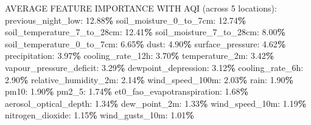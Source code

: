 \documentclass[
  letterpaper,
  DIV=11,
  numbers=noendperiod]{scrartcl}
\newenvironment{Shaded}{\begin{snugshade}}{\end{snugshade}}
\newcommand{\DecValTok}[1]{\textcolor[rgb]{0.00,0.00,0.81}{#1}}
\newcommand{\FloatTok}[1]{\textcolor[rgb]{0.00,0.00,0.81}{#1}}
\newcommand{\NormalTok}[1]{#1}
\newcommand{\OperatorTok}[1]{\textcolor[rgb]{0.81,0.36,0.00}{\textbf{#1}}}
\begin{document}
\begin{Shaded}
\begin{Highlighting}[]
\NormalTok{AVERAGE FEATURE IMPORTANCE WITH AQI (across }\DecValTok{5}\NormalTok{ locations):}
\NormalTok{  previous\_night\_low: }\FloatTok{12.88}\OperatorTok{\%}
\NormalTok{  soil\_moisture\_0\_to\_7cm: }\FloatTok{12.74}\OperatorTok{\%}
\NormalTok{  soil\_temperature\_7\_to\_28cm: }\FloatTok{12.41}\OperatorTok{\%}
\NormalTok{  soil\_moisture\_7\_to\_28cm: }\FloatTok{8.00}\OperatorTok{\%}
\NormalTok{  soil\_temperature\_0\_to\_7cm: }\FloatTok{6.65}\OperatorTok{\%}
\NormalTok{  dust: }\FloatTok{4.90}\OperatorTok{\%}
\NormalTok{  surface\_pressure: }\FloatTok{4.62}\OperatorTok{\%}
\NormalTok{  precipitation: }\FloatTok{3.97}\OperatorTok{\%}
\NormalTok{  cooling\_rate\_12h: }\FloatTok{3.70}\OperatorTok{\%}
\NormalTok{  temperature\_2m: }\FloatTok{3.42}\OperatorTok{\%}
\NormalTok{  vapour\_pressure\_deficit: }\FloatTok{3.29}\OperatorTok{\%}
\NormalTok{  dewpoint\_depression: }\FloatTok{3.12}\OperatorTok{\%}
\NormalTok{  cooling\_rate\_6h: }\FloatTok{2.90}\OperatorTok{\%}
\NormalTok{  relative\_humidity\_2m: }\FloatTok{2.14}\OperatorTok{\%}
\NormalTok{  wind\_speed\_100m: }\FloatTok{2.03}\OperatorTok{\%}
\NormalTok{  rain: }\FloatTok{1.90}\OperatorTok{\%}
\NormalTok{  pm10: }\FloatTok{1.90}\OperatorTok{\%}
\NormalTok{  pm2\_5: }\FloatTok{1.74}\OperatorTok{\%}
\NormalTok{  et0\_fao\_evapotranspiration: }\FloatTok{1.68}\OperatorTok{\%}
\NormalTok{  aerosol\_optical\_depth: }\FloatTok{1.34}\OperatorTok{\%}
\NormalTok{  dew\_point\_2m: }\FloatTok{1.33}\OperatorTok{\%}
\NormalTok{  wind\_speed\_10m: }\FloatTok{1.19}\OperatorTok{\%}
\NormalTok{  nitrogen\_dioxide: }\FloatTok{1.15}\OperatorTok{\%}
\NormalTok{  wind\_gusts\_10m: }\FloatTok{1.01}\OperatorTok{\%}
\end{Highlighting}
\end{Shaded}
\end{document}
